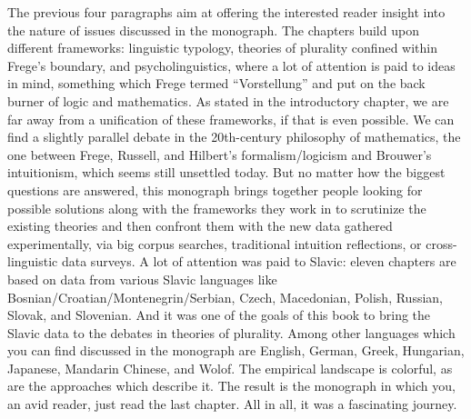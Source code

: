 \documentclass[output=paper]{langscibook}
\begin{document}
The previous four paragraphs aim at offering the interested reader insight into the nature of issues discussed in the monograph. The chapters build upon different frameworks: linguistic typology, theories of plurality confined within Frege's boundary, and psycholinguistics, where a lot of attention is paid to ideas in mind, something which Frege termed ``Vorstellung'' and put on the back burner of logic and mathematics. As stated in the introductory chapter, we are far away from a unification of these frameworks, if that is even possible. We can find a slightly parallel debate in the 20th-century philosophy of mathematics, the one between Frege, Russell, and Hilbert's formalism/logicism and Brouwer's intuitionism, which seems still unsettled today. But no matter how the biggest questions are answered, this monograph brings together people looking for possible solutions along with the frameworks they work in to scrutinize the existing theories and then confront them with the new data gathered experimentally, via big corpus searches, traditional intuition reflections, or cross-linguistic data surveys. A lot of attention was paid to Slavic: eleven chapters are based on data from various Slavic languages like Bosnian/Croatian/Montenegrin/Serbian, Czech, Macedonian, Polish, Russian, Slovak, and Slovenian. And it was one of the goals of this book to bring the Slavic data to the debates in theories of plurality. Among other languages which you can find discussed in the monograph are English, German, Greek, Hungarian, Japanese, Mandarin Chinese, and Wolof. The empirical landscape is colorful, as are the approaches which describe it. The result is the monograph in which you, an avid reader, just read the last chapter. All in all, it was a fascinating journey.



{\sloppy\printbibliography[heading=subbibliography,notkeyword=this]}
\end{document}
